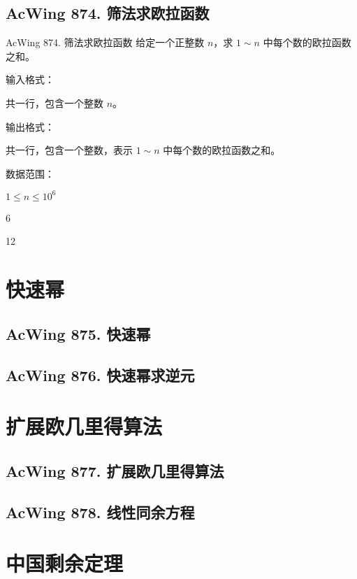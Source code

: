 \subsection{AcWing 874. 筛法求欧拉函数}
\begin{titledbox}{AcWing 874. 筛法求欧拉函数}
    给定一个正整数 $n$，求 $1 \sim n$ 中每个数的欧拉函数之和。

    输入格式：

    共一行，包含一个整数 $n$。

    输出格式：

    共一行，包含一个整数，表示 $1 \sim n$ 中每个数的欧拉函数之和。

    数据范围：

    $1 \le n \le 10^6$

    \begin{inputblock}
        6
    \end{inputblock}
    \begin{outputblock}
        12
    \end{outputblock}
\end{titledbox}


\section{快速幂}

\subsection{AcWing 875. 快速幂}

\subsection{AcWing 876. 快速幂求逆元}


\section{扩展欧几里得算法}

\subsection{AcWing 877. 扩展欧几里得算法}

\subsection{AcWing 878. 线性同余方程}


\section{中国剩余定理}

